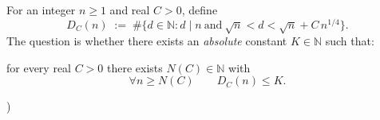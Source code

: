 \noindent For an integer $n\ge 1$ and real $C>0$, define
\[
D_C(n) \;:=\; \#\Big\{d\in\mathbb{N}: d\mid n\ \text{and}\ \sqrt n< d < \sqrt n + C\,n^{1/4}\Big\}.
\]
The question is whether there exists an \emph{absolute} constant $K\in\mathbb{N}$ such that:

\noindent for every real $C>0$ there exists $N(C)\in\mathbb{N}$ with
\[
\forall n\ge N(C)\qquad D_C(n)\le K.
\]

)
